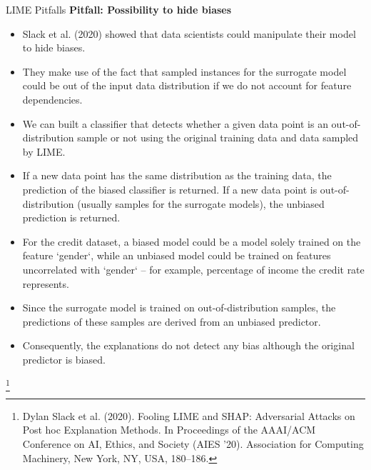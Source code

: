 \documentclass[11pt,compress,t,notes=noshow, aspectratio=169, xcolor=table]{beamer}
\begin{document}
\begin{vbframe}[allowframebreaks]{LIME Pitfalls}
\textbf{Pitfall: Possibility to hide biases}
\begin{itemize}
	\item Slack et al. (2020) showed that data scientists could manipulate their model to hide biases. 
	\item They make use of the fact that sampled instances for the surrogate model could be out of the input data distribution if we do not account for feature dependencies. 
	\item We can built a classifier that detects whether a given data point is an out-of-distribution sample or not using the original training data and data sampled by LIME. 
	\item If a new data point has the same distribution as the training data, the prediction of the biased classifier is returned. If a new data point is out-of-distribution (usually samples for the surrogate models), the unbiased prediction is returned.
	\item For the credit dataset, a biased model could be a model solely trained on the feature `gender`, while an unbiased model could be trained on features uncorrelated with `gender` -- for example, percentage of income the credit rate represents.   
	\item Since the surrogate model is trained on out-of-distribution samples, the predictions of these samples are derived from an unbiased predictor. 
	\item Consequently, the explanations do not detect any bias although the original predictor is biased. 
\end{itemize}
\footnote[frame]{Dylan Slack et al. (2020). Fooling LIME and SHAP: Adversarial Attacks on Post hoc Explanation Methods. In Proceedings of the AAAI/ACM Conference on AI, Ethics, and Society (AIES '20). Association for Computing Machinery, New York, NY, USA, 180–186.}
\end{vbframe}
\end{document}
